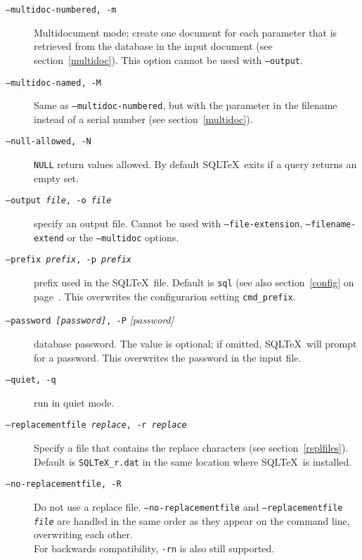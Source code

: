 \documentclass{article}
\begin{document}
\begin{description}
\item[\texttt{--multidoc-numbered, -m}] Multidocument mode; create one document for each parameter that is retrieved
from the database in the input document (see section~\ref{multidoc}). This option cannot be used with \texttt{--output}.

\item[\texttt{--multidoc-named, -M}] Same as \texttt{--multidoc-numbered}, but with the parameter in the filename instead of a serial number (see section~\ref{multidoc}).

\item[\texttt{--null-allowed, -N}] \texttt{NULL} return values allowed. By default SQL\TeX\ exits if a
query returns an empty set.

\item[\texttt{--output \textit{file}, -o \textit{file}}] specify an output file. Cannot be used with \texttt{--file-extension},
\texttt{--filename-extend} or the  \texttt{--multidoc} options.

\item[\texttt{--prefix \textit{prefix}, -p \textit{prefix}}] prefix used in the SQL\TeX\ file. Default is \texttt{sql} (see also section~\ref{config}
on page~\pageref{prefix}. This overwrites the configurarion setting \texttt{cmd\_prefix}.

\item[\texttt{--password \textit{[password]}, -P} \textit{[password]}] database password. The value is optional; if omitted, SQL\TeX\ will prompt for a password. This overwrites the password in the input file.\\

\item[\texttt{--quiet, -q}] run in quiet mode.

\item[\texttt{--replacementfile \textit{replace}, -r \textit{replace}}] Specify a file that contains the replace characters (see section~\ref{replfiles}). \\
Default is \texttt{SQLTeX{\_}r.dat} in the same location where SQL\TeX\ is installed.

\item[\texttt{--no-replacementfile, -R}] Do not use a replace file. \texttt{--no-replacementfile} and \texttt{--replacementfile \textit{file}} are handled in the same order as
they appear on the command line, overwriting each other.\\
For backwards compatibility, \texttt{-rn} is also still supported.


\end{description}
\end{document}
